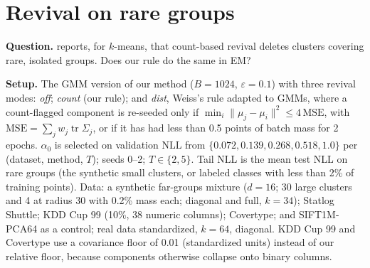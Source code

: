 \documentclass[10pt]{article}
\begin{document}
\section{Revival on rare groups}\label{app:rare}
\textbf{Question.} \citet{weiss2026small} reports, for $k$-means, that count-based revival deletes clusters covering
rare, isolated groups. Does our rule do the same in EM?

\textbf{Setup.} The GMM version of our method ($B = 1024$, $\varepsilon = 0.1$) with three revival modes:
\emph{off}; \emph{count} (our rule); and \emph{dist}, Weiss's rule adapted to GMMs, where a count-flagged component
is re-seeded only if $\min_i \|\mu_j - \mu_i\|^2 \le 4\,\mathrm{MSE}$, with $\mathrm{MSE} = \sum_j w_j
\operatorname{tr} \Sigma_j$, or if it has had less than 0.5 points of batch mass for 2 epochs. $\alpha_0$ is selected
on validation NLL from $\{0.072, 0.139, 0.268, 0.518, 1.0\}$ per (dataset, method, $T$); seeds 0--2; $T \in \{2,
5\}$. Tail NLL is the mean test NLL on rare groups (the synthetic small clusters, or labeled classes with less than
2\% of training points). Data: a synthetic far-groups mixture ($d = 16$; 30 large clusters and 4 at radius 30 with
0.2\% mass each; diagonal and full, $k = 34$); Statlog Shuttle; KDD Cup 99 (10\%, 38 numeric columns); Covertype; and
SIFT1M-PCA64 as a control; real data standardized, $k = 64$, diagonal. KDD Cup 99 and Covertype use a covariance floor
of 0.01 (standardized units) instead of our relative floor, because components otherwise collapse onto binary columns.
\end{document}
